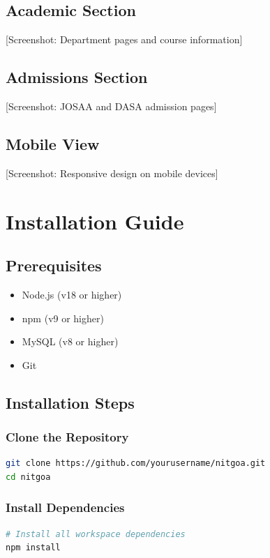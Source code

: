 \documentclass[12pt,a4paper]{report}
\begin{document}
\begin{appendices}
\section{Academic Section}
[Screenshot: Department pages and course information]

\section{Admissions Section}
[Screenshot: JOSAA and DASA admission pages]

\section{Mobile View}
[Screenshot: Responsive design on mobile devices]

\chapter{Installation Guide}

\section{Prerequisites}
\begin{itemize}
    \item Node.js (v18 or higher)
    \item npm (v9 or higher)
    \item MySQL (v8 or higher)
    \item Git
\end{itemize}

\section{Installation Steps}

\subsection{Clone the Repository}
\begin{lstlisting}[language=bash]
git clone https://github.com/yourusername/nitgoa.git
cd nitgoa
\end{lstlisting}

\subsection{Install Dependencies}
\begin{lstlisting}[language=bash]
# Install all workspace dependencies
npm install
\end{lstlisting}


\end{appendices}
\end{document}
